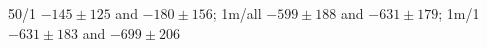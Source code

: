 50/1 $-145\pm125$ and $-180\pm156$; 1m/all $-599\pm188$ and $-631\pm179$; 1m/1 $-631\pm183$ and $-699\pm206$
